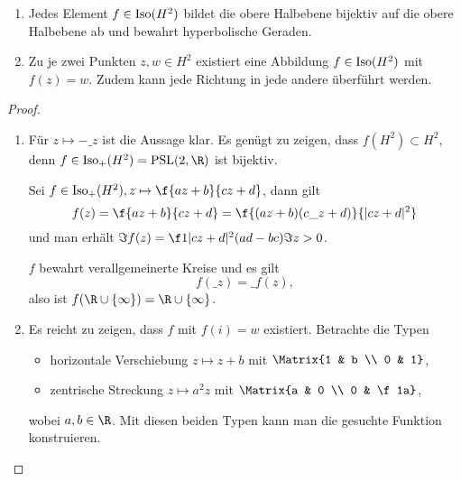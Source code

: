 \begin{st}
	\begin{enumerate}[1)]
		\item
			Jedes Element $f \in \operatorname{Iso}(H^2)$ bildet die obere Halbebene bijektiv auf die obere Halbebene ab und bewahrt hyperbolische Geraden.
		\item
			Zu je zwei Punkten $z, w \in H^2$ existiert eine Abbildung $f \in \operatorname{Iso}(H^2)$ mit $f(z) = w$.
			Zudem kann jede Richtung in jede andere überführt werden.
	\end{enumerate}
	\begin{proof}
		\begin{enumerate}[1)]
			\item
				Für $z \mapsto - \_ z$ ist die Aussage klar.
				Es genügt zu zeigen, dass $f(H^2) \subset H^2$, denn $f \in \Iso_+(H^2) = \PSL(2, \R)$ ist bijektiv.

				Sei $f \in \Iso_+(H^2), z \mapsto \f{az + b}{cz + d}$, dann gilt
				\[
					f(z) = \f {az + b}{cz + d} = \f{(az + b)(c\_z + d)}{|cz + d|^2}
				\]
				und man erhält $\Im f(z) = \f 1{|cz + d|^2} (ad - bc) \Im z > 0$.

				$f$ bewahrt verallgemeinerte Kreise und es gilt
				\[
					f(\_z) = \_{f(z)},
				\]
				also ist $f(\R \cup \{\infty\}) = \R \cup \{\infty\}$.
			\item
				Es reicht zu zeigen, dass $f$ mit $f(i) = w$ existiert.
				Betrachte die Typen
				\begin{itemize}
					\item
						horizontale Verschiebung $z \mapsto z + b$ mit $\Matrix{1 & b \\ 0 & 1}$,
					\item
						zentrische Streckung $z \mapsto a^2 z$ mit $\Matrix{a & 0 \\ 0 & \f 1a}$,
				\end{itemize}
				wobei $a, b \in \R$.
				Mit diesen beiden Typen kann man die gesuchte Funktion konstruieren.


\end{enumerate}
\end{proof}
\end{st}
